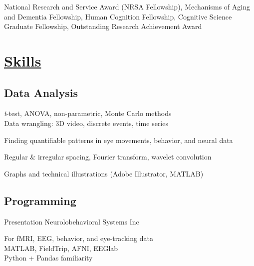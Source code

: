 \documentclass[]{winter-resume-openfont}
\begin{document}
\begin{minipage}[t]{0.65\textwidth}
National Research and Service Award (NRSA Fellowship), Mechanisms of Aging and Dementia Fellowship,
Human Cognition Fellowship, Cognitive Science Graduate Fellowship, Outstanding Research Achievement Award

\end{minipage} 
\hfill
\begin{minipage}[t]{0.3\textwidth} 

\sectionsep

\section{\underline{Skills}}
\sectionsep
\sectionsep
\subsection{Data Analysis}
\textbullet{} \emph{t}-test, ANOVA, non-parametric, Monte Carlo methods \\
\sectionsep
\textbullet{} Data wrangling: 3D video, discrete events, time series
\sectionsep
 

\textbullet{} Finding quantifiable patterns in eye movements, behavior, and neural data \\
\sectionsep
 
\textbullet{}  Regular \& irregular spacing, Fourier transform, wavelet convolution \\
\sectionsep
 

\textbullet{}  Graphs and technical illustrations (Adobe Illustrator, MATLAB) \\
 
 \sectionsep
\sectionsep
\subsection{Programming}
\textbullet{}  Presentation Neurolobehavioral Systems Inc \\
\sectionsep
 

\textbullet{}  For fMRI, EEG, behavior, and eye-tracking data \\
\sectionsep
\textbullet{}  MATLAB, FieldTrip, AFNI, EEGlab \\
\sectionsep
\textbullet{}  Python + Pandas familiarity \\
\sectionsep
\sectionsep


\end{minipage}
\end{document}
